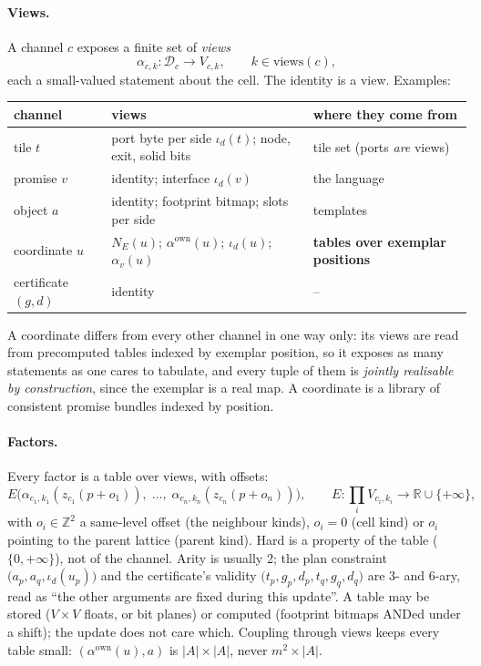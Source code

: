 \documentclass[11pt]{article}
\newcommand{\Z}{\mathbb{Z}}
\newcommand{\R}{\mathbb{R}}
\newcommand{\1}{\mathds{1}}
\newcommand{\Dom}{\mathcal{D}}
\begin{document}
\paragraph{Views.} A channel $c$ exposes a finite set of \emph{views}
\[
  \alpha_{c,k} : \Dom_c \to V_{c,k}, \qquad k \in \mathrm{views}(c),
\]
each a small-valued statement about the cell. The identity is a view. Examples:
\begin{center}
\small
\begin{tabular}{@{}lll@{}}
\toprule
channel & views & where they come from \\
\midrule
tile $t$ & port byte per side $\iota_d(t)$; node, exit, solid bits & tile set (ports \emph{are} views) \\
promise $v$ & identity; interface $\iota_d(v)$ & the language \\
object $a$ & identity; footprint bitmap; slots per side & templates \\
coordinate $u$ & $N_E(u)$; $\alpha^{\mathrm{own}}(u)$; $\iota_d(u)$; $\alpha_v(u)$ & \textbf{tables over exemplar positions} \\
certificate $(g,d)$ & identity & -- \\
\bottomrule
\end{tabular}
\end{center}
A coordinate differs from every other channel in one way only: its views are
read from precomputed tables indexed by exemplar position, so it exposes as
many statements as one cares to tabulate, and every tuple of them is
\emph{jointly realisable by construction}, since the exemplar is a real map. A
coordinate is a library of consistent promise bundles indexed by position.

\paragraph{Factors.} Every factor is a table over views, with offsets:
\[
  E\big(\alpha_{c_1,k_1}(z_{c_1}(p + o_1)),\; \dots,\; \alpha_{c_n,k_n}(z_{c_n}(p + o_n))\big),
  \qquad E : \textstyle\prod_i V_{c_i,k_i} \to \R \cup \{+\infty\},
\]
with $o_i \in \Z^2$ a same-level offset (the neighbour kinds), $o_i = 0$ (cell
kind) or $o_i$ pointing to the parent lattice (parent kind). Hard is a property
of the table ($\{0, +\infty\}$), not of the channel. Arity is usually 2; the
plan constraint $\big(a_p, a_q, \iota_d(u_p)\big)$ and the certificate's validity
$\big(t_p, g_p, d_p, t_q, g_q, d_q\big)$ are 3- and 6-ary, read as ``the other
arguments are fixed during this update''. A table may be stored
($V \times V$ floats, or bit planes) or computed (footprint bitmaps ANDed under a
shift); the update does not care which. Coupling through views keeps every
table small: $(\alpha^{\mathrm{own}}(u), a)$ is $|A| \times |A|$, never $m^2 \times |A|$.
\end{document}

